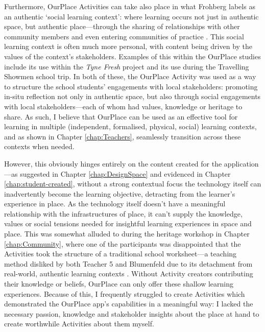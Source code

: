 Furthermore, OurPlace Activities can take also place in what Frohberg labels as an authentic `social learning context': where learning occurs not just in authentic space, but authentic place---through the sharing of relationships with other community members and even entering communities of practice \citep{lave1991situated}. This social learning context is often much more personal, with content being driven by the values of the context's stakeholders. Examples of this within the OurPlace studies include its use within the \textit{Tyne Fresh} project and its use during the Travelling Showmen school trip. In both of these, the OurPlace Activity was used as a way to structure the school students' engagements with local stakeholders: promoting in-situ reflection not only in authentic space, but also through social engagements with local stakeholders---each of whom had values, knowledge or heritage to share. As such, I believe that OurPlace can be used as an effective tool for learning in multiple (independent, formalised, physical, social) learning contexts, and as shown in Chapter \ref{chap:Teachers}, seamlessly transition across these contexts when needed.

However, this obviously hinges entirely on the content created for the application---as suggested in Chapter \ref{chap:DesignSpace} and evidenced in Chapter \ref{chap:student-created}, without a strong contextual focus the technology itself can inadvertently become the learning objective, detracting from the learner's experience in place. As the technology itself doesn't have a meaningful relationship with the infrastructures of place, it can't supply the knowledge, values or social tensions needed for insightful learning experiences in space and place. This was somewhat alluded to during the heritage workshop in Chapter \ref{chap:Community}, where one of the participants was disappointed that the Activities took the structure of a traditional school worksheet---a teaching method disliked by both Teacher 5 and Blumenfeld due to its detachment from real-world, authentic learning contexts \citep{Blumenfeld1991}. Without Activity creators contributing their knowledge or beliefs, OurPlace can only offer these shallow learning experiences. Because of this, I frequently struggled to create Activities which demonstrated the OurPlace app's capabilities in a meaningful way: I lacked the necessary passion, knowledge and stakeholder insights about the place at hand to create worthwhile Activities about them myself.


